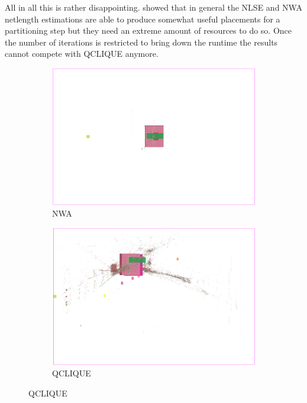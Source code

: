 All in all this is rather disappointing.
 showed that in general the NLSE and NWA netlength estimations are able to produce
somewhat useful placements for a partitioning step but they need an extreme amount of resources to do so.
Once the number of iterations is restricted to bring down the runtime the results cannot compete with QCLIQUE anymore.

\begin{figure}[p]
 \centering

 \begin{subfigure}{.6\textwidth}
  \includegraphics[width=\textwidth]{hpwl_qclique_comparisons/placement_Chip1_NWA.png}
  \caption{NWA}
 \end{subfigure}
 
 \bigskip
 
 \begin{subfigure}{.6\textwidth}
  \includegraphics[width=\textwidth]{hpwl_qclique_comparisons/placement_Chip1_QCLIQUE.png}
  \caption{QCLIQUE}
 \end{subfigure}
 

\end{figure}
